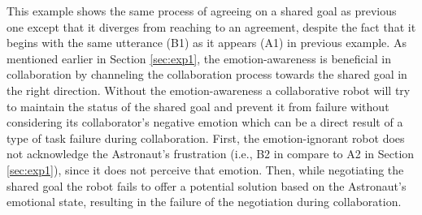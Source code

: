 This example shows the same process of agreeing on a shared goal as previous
one except that it diverges from reaching to an agreement, despite the fact
that it begins with the same utterance (B1) as it appears (A1) in previous
example. As mentioned earlier in Section \ref{sec:exp1}, the emotion-awareness
is beneficial in collaboration by channeling the collaboration process towards
the shared goal in the right direction. Without the emotion-awareness a
collaborative robot will try to maintain the status of the shared goal and
prevent it from failure without considering its collaborator's negative emotion
which can be a direct result of a type of task failure during collaboration.
First, the emotion-ignorant robot does not acknowledge the Astronaut's
frustration (i.e., B2 in compare to A2 in Section \ref{sec:exp1}), since it does
not perceive that emotion. Then, while negotiating the shared goal the robot
fails to offer a potential solution based on the Astronaut's emotional state,
resulting in the failure of the negotiation during collaboration.


